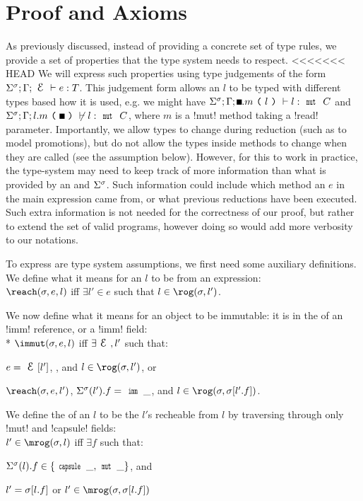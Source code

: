 \section{Proof and Axioms}
\label{s:proof}

As previously discussed, instead of providing a concrete set of type rules, we provide a set of properties that the type system needs to respect.
<<<<<<< HEAD
We will express such properties using type judgements of the form $\ty{e}{T}$. This judgement form allows an $l$ to be typed with different types based how it is used, e.g. we might have $\S;\G;\h.m\oR l \cR \vdash l : \Kw{mut}\ C$  and $\S;\G;l.m\oR \h \cR \nvdash l : \Kw{mut}\ C$, where $m$ is a \Q!mut! method taking a \Q!read! parameter. Importantly, we allow types to change during reduction (such as to model promotions), but do not allow the types inside methods to change when they are called (see the  assumption below). However, for this to work in practice, the type-system may need to keep track of more information than what is provided by an \E and $\S$. Such information could include which method an $e$ in the main expression came from, or what previous reductions have been executed. Such extra information is not needed for the correctness of our proof, but rather to extend the set of valid programs, however doing so would add more verbosity to our notations.

To express are type system assumptions, we first need some auxiliary definitions. We define what it means for an $l$ to be \reach from an expression:\\
\indent $\reach(\s, e, l)$ iff $\exists l' \in e$ such that $l \in \rog(\s, l')$.

\noindent We now define what it means for an object to be immutable: it is in the \rog of an \Q!imm! reference, or a \reach \Q!imm! field:\\*
\indent $\immut(\s, e, l)$ iff $\exists \E, l'$ such that:
\begin{iitemize}
\item $e = \E[l']$, , and $l \in \rog(\s, l')$, or
\item $\reach(\s, e, l')$, $\Ss(l').f = \Kw{imm}\,\_$, and $l \in \rog(\s, \s[l'.f])$.
\end{iitemize}

\noindent We define the \mrog of an $l$ to be the $l'$s recheable from $l$ by traversing through only \Q!mut! and \Q!capsule! fields:\\
\indent $l' \in \mrog(\s, l)$ iff $\exists f$ such that:
\begin{iitemize}
	\item $\Ss(l).f \in \{\Kw{capsule}\,\_, \Kw{mut}\,\_\}$, and
	\item $l' = \s[l.f]$ or $l' \in \mrog(\s, \s[l.f])$
\end{iitemize}


